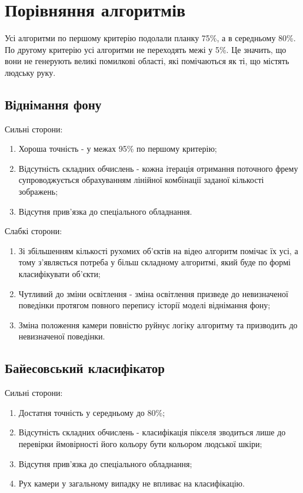 \section{Порівняння алгоритмів}

Усі алгоритми по першому критерію подолали планку 75\%, а в середньому 80\%. По другому критерію усі алгоритми не переходять межі у 5\%. Це значить, що вони не генерують великі помилкові області, які помічаються як ті, що містять людську руку.

\subsection{Віднімання фону}

Сильні сторони:
\begin{enumerate}
	\item Хороша точність - у межах 95\% по першому критерію;
	\item Відсутність складних обчислень - кожна ітерація отримання поточного фрему супроводжується обрахуванням лінійної комбінації заданої кількості зображень;
	\item Відсутня прив'язка до спеціального обладнання.
\end{enumerate}

Слабкі сторони:
\begin{enumerate}
	\item Зі збільшенням кількості рухомих об'єктів на відео алгоритм помічає їх усі, а тому з'являється потреба у більш складному алгоритмі, який буде по формі класифікувати об'єкти;
	\item Чутливий до зміни освітлення - зміна освітлення призведе до невизначеної поведінки протягом повного перепису історії моделі віднімання фону;
	\item Зміна положення камери повністю руйнує логіку алгоритму та призводить до невизначеної поведінки.
\end{enumerate}

\subsection{Байесовський класифікатор}

Сильні сторони:
\begin{enumerate}
	\item Достатня точність у середньому до 80\%;
	\item Відсутність складних обчислень - класифікація пікселя зводиться лише до перевірки ймовірності його кольору бути кольором людської шкіри;
	\item Відсутня прив'язка до спеціального обладнання;
	\item Рух камери у загальному випадку не впливає на класифікацію.
\end{enumerate}


